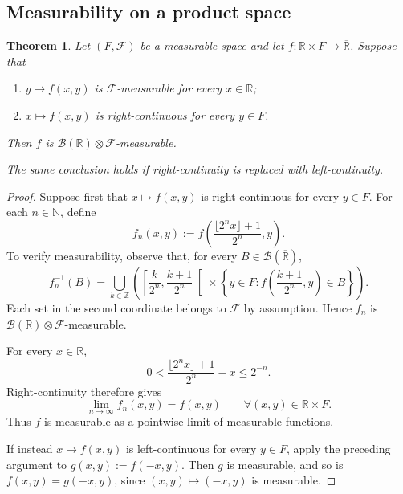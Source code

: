 \documentclass[11pt, a4paper, openany]{book}
\newtheorem{thm}{Theorem}\newtheorem{lem}{Lemma}\newtheorem{crl}{Corollary}
\theoremstyle{definition}
\begin{document}
\subsection{Measurability on a product space}
    \begin{thm}\label{measurability on a product space}
        Let $(F,\mathscr{F})$ be a measurable space and let
        $f:\mathbb{R}\times F\rightarrow\overline{\mathbb{R}}$.
        Suppose that
        \begin{enumerate}
            \item $y\mapsto f(x,y)$ is $\mathscr{F}$-measurable
            for every $x\in\mathbb{R}$;
            \item $x\mapsto f(x,y)$ is right-continuous
            for every $y\in F$.
        \end{enumerate}
        Then $f$ is
        $\mathscr{B}(\mathbb{R})\otimes\mathscr{F}$-measurable.
    
        The same conclusion holds if right-continuity is replaced
        with left-continuity.
    \end{thm}
    \begin{proof}
        Suppose first that $x\mapsto f(x,y)$ is right-continuous
        for every $y\in F$.
        For each $n\in\mathbb{N}$, define
        \[
            f_n(x,y):=
            f\left(\frac{\lfloor 2^n x\rfloor+1}{2^n},y\right).
        \]
        To verify measurability, observe that, for every
        $B\in\mathscr{B}(\overline{\mathbb{R}})$,
        \[
            f_n^{-1}(B)
            =
            \bigcup_{k\in\mathbb{Z}}
            \left(
                \left[\frac{k}{2^n},\frac{k+1}{2^n}\right[
                \times
                \left\{
                    y\in F:
                    f\left(\frac{k+1}{2^n},y\right)\in B
                \right\}
            \right).
        \]
        Each set in the second coordinate belongs to $\mathscr{F}$
        by assumption. Hence $f_n$ is
        $\mathscr{B}(\mathbb{R})\otimes\mathscr{F}$-measurable.
    
        For every $x\in\mathbb{R}$,
        \[
            0<
            \frac{\lfloor 2^n x\rfloor+1}{2^n}-x
            \leqslant 2^{-n}.
        \]
        Right-continuity therefore gives
        \[
            \lim_{n\to\infty}f_n(x,y)=f(x,y)
            \qquad
            \forall (x,y)\in\mathbb{R}\times F.
        \]
        Thus $f$ is measurable as a pointwise limit of measurable
        functions.
    
        If instead $x\mapsto f(x,y)$ is left-continuous for every
        $y\in F$, apply the preceding argument to
        $g(x,y):=f(-x,y)$.
        Then $g$ is measurable, and so is
        $f(x,y)=g(-x,y)$, since $(x,y)\mapsto(-x,y)$ is measurable.
    \end{proof}
\end{document}
